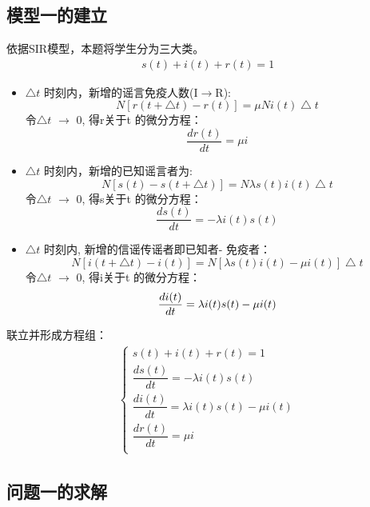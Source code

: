 \documentclass[withoutpreface,bwprint]{cumcmthesis}
\begin{document}
\subsection{模型一的建立}
依据SIR模型，本题将学生分为三大类。
\begin{align*}
s(t)+i(t)+r(t) = 1
\end{align*}
\begin{itemize}
	\item $\bigtriangleup t$ 时刻内，新增的谣言免疫人数(I$\longrightarrow$R):
	\[
	N[r(t+\bigtriangleup t)-r(t)]= \mu N i(t)\bigtriangleup t
	\]
	令$\bigtriangleup t$ $\longrightarrow$ 0, 得r关于t 的微分方程：
	\[
	\frac{dr(t)}{dt} = \mu i
	\]
	\item $\bigtriangleup t$ 时刻内，新增的已知谣言者为:
	\[
	N[s(t)-s(t+\bigtriangleup t)]= N\lambda s(t)i(t)\bigtriangleup t
	\]
	令$\bigtriangleup t$ $\longrightarrow$ 0, 得s关于t 的微分方程：
	\[
	\frac{ds(t)}{dt} = -\lambda i(t)s(t)
	\]
	\item $\bigtriangleup t$ 时刻内, 新增的信谣传谣者即已知者- 免疫者：
	\[
	N[i(t+\bigtriangleup t)-i(t)]=N[\lambda s(t)i(t)-\mu i(t)]\bigtriangleup t
	\]
	令$\bigtriangleup t$ $\longrightarrow$ 0, 得i关于t 的微分方程：
	\[
	\frac{di(t)}{dt} = \lambda i(t)s(t) - \mu i(t)\\
	\]
		
\end{itemize}

联立并形成方程组：
\begin{align*}
	\begin{cases}
		s(t)+i(t)+r(t) = 1 \\
		\dfrac{ds(t)}{dt} = -\lambda i(t)s(t) \\
		\dfrac{di(t)}{dt} = \lambda i(t)s(t) - \mu i(t)\\
		\dfrac{dr(t)}{dt} = \mu i\\
	\end{cases}
\end{align*}
\subsection{问题一的求解}
\end{document}
